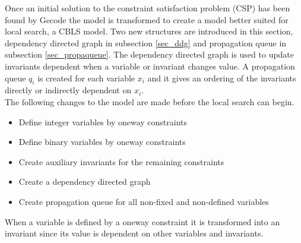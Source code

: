Once an initial solution to the constraint satisfaction problem (CSP) has been found by Gecode the model is transformed 
to create a model better suited for local search, a CBLS model. Two new structures  are introduced in this section, dependency directed graph  in 
subsection \ref{sec_ddg} and propagation queue in subsection \ref{sec_propaqueue}.  The dependency directed graph is 
used to update invariants dependent when a variable or invariant changes value. A propagation queue $q_i$ is created 
for each variable $x_i$ and it gives an ordering of the invariants directly or indirectly dependent on $x_i$. \\
The following changes to the model are made before the local search can begin. 
\begin{itemize}
 \item Define integer variables by oneway constraints
 \item Define binary variables by oneway constraints 
 \item Create auxiliary invariants for the remaining constraints
 \item Create a dependency directed graph
 \item Create propagation queue for all non-fixed and non-defined variables
\end{itemize}
When a variable is defined by a oneway constraint it is transformed into an invariant since its value is dependent on 
other variables and invariants. 